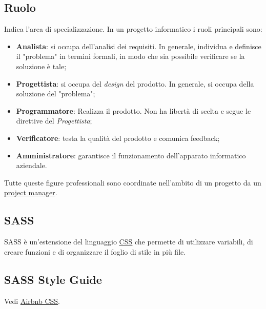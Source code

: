 	\subsection{Ruolo}
	\label{sec:ruolo}
	Indica l'area di specializzazione.
	In un progetto informatico i ruoli principali sono:
	\begin{itemize}
	\item \textbf{Analista}: si occupa dell'analisi dei requisiti. In generale, individua e definisce il "problema" in termini formali, in modo che sia possibile verificare se la soluzione è tale;
	\item \textbf{Progettista}: si occupa del \emph{design} del prodotto. In generale, si occupa della soluzione del "problema";
	\item \textbf{Programmatore}: Realizza il prodotto. Non ha libertà di scelta e segue le direttive del \emph{Progettista};
	\item \textbf{Verificatore}: testa la qualità del prodotto e comunica feedback;
	\item \textbf{Amministratore}: garantisce il funzionamento dell'apparato informatico aziendale.
	\end{itemize}
	Tutte queste figure professionali sono coordinate nell'ambito di un progetto da un \underline{\hyperref[sec:projectmanager]{project manager}}.


	\newpage

	\subsection{SASS}
	\label{sec:sass}
	SASS è un'estensione del linguaggio \underline{\hyperref[sec:css]{CSS}} che permette di utilizzare variabili, di creare funzioni e di organizzare il foglio di stile in più file.
	
	
	\subsection{SASS Style Guide}
	\label{sec:sasssg}
	Vedi \underline{\hyperref[sec:airbnb]{Airbnb CSS}}.
	
